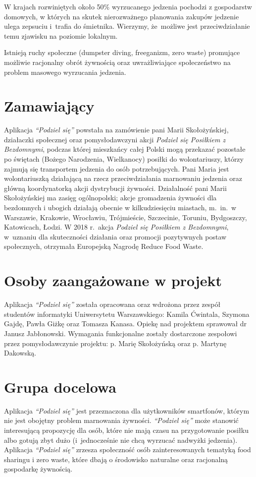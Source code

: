 \documentclass[licencjacka]{pracamgr}
\begin{document}
W krajach rozwiniętych około 50\% wyrzucanego jedzenia pochodzi z gospodarstw domowych, w których na skutek nierozważnego planowania zakupów jedzenie ulega zepsuciu i~trafia do śmietnika. Wierzymy, że~możliwe jest przeciwdziałanie temu zjawisku na poziomie lokalnym.

Istnieją ruchy społeczne (dumpster diving, freeganizm, zero waste) promujące możliwie racjonalny obrót żywnością oraz uwrażliwiające społeczeństwo na problem masowego wyrzucania jedzenia.

\section*{Zamawiający}
Aplikacja \textit{``Podziel się''} powstała na zamówienie pani Marii Skołożyńskiej, działaczki społecznej oraz pomysłodawczyni akcji \textit{Podziel się Posiłkiem z Bezdomnymi}, podczas której mieszkańcy całej Polski mogą przekazać pozostałe po świętach (Bożego Narodzenia, Wielkanocy) posiłki do wolontariuszy, którzy zajmują się transportem jedzenia do osób potrzebujących. Pani Maria jest wolontariuszką działającą na rzecz przeciwdziałania marnowaniu jedzenia oraz główną koordynatorką akcji dystrybucji żywności. Działalność pani Marii Skołożyńskiej ma zasięg ogólnopolski; akcje gromadzenia żywności dla bezdomnych i ubogich działają obecnie w kilkudziesięciu miastach, m.\ in.\ w Warszawie, Krakowie, Wrocławiu, Trójmieście, Szczecinie, Toruniu, Bydgoszczy, Katowicach, Łodzi. W 2018 r.\ akcja \textit{Podziel się Posiłkiem z Bezdomnymi}, w~uznaniu dla skuteczności działania oraz promocji pozytywnych postaw społecznych, otrzymała Europejską Nagrodę Reduce Food Waste.

\section*{Osoby zaangażowane w projekt}
Aplikacja \textit{``Podziel się''} została opracowana oraz wdrożona przez zespół studentów informatyki Uniwersytetu Warszawskiego: Kamila Ćwintala, Szymona Gajdę, Pawła Giżkę oraz Tomasza Kanasa. Opiekę nad projektem sprawował dr Janusz Jabłonowski. Wymagania funkcjonalne zostały dostarczone zespołowi przez pomysłodawczynie projektu: p. Marię Skołożyńską oraz p. Martynę Dakowską.

\section*{Grupa docelowa}
Aplikacja \textit{``Podziel się''} jest przeznaczona dla użytkowników smartfonów, którym nie jest obojętny problem marnowania żywności. \textit{``Podziel się''} może stanowić interesującą propozycję dla osób, które nie mają czasu na przygotowanie posiłku albo gotują zbyt dużo (i~jednocześnie nie chcą wyrzucać nadwyżki jedzenia). Aplikacja \textit{``Podziel się''} zrzesza społeczność osób zainteresowanych tematyką food sharingu i zero waste, które dbają o środowisko naturalne oraz racjonalną gospodarkę żywnością.
\end{document}
